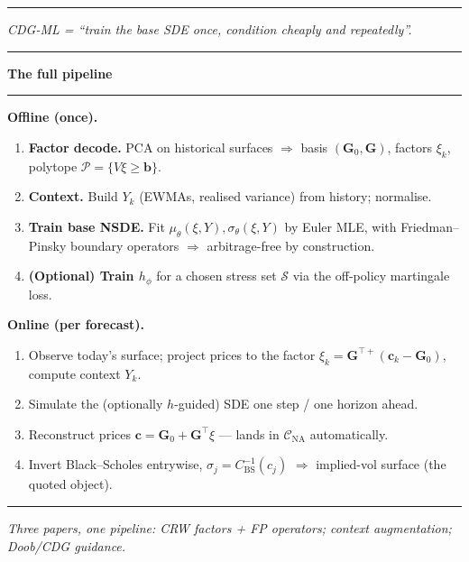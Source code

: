 \documentclass[12pt]{article}
\newcommand{\slide}[1]{%
  \par\noindent\rule{\linewidth}{1.2pt}\par\vspace{2pt}%
  {\LARGE\bfseries #1}\par\vspace{2pt}%
  \noindent\rule{\linewidth}{0.5pt}\par\vspace{8pt}}
\newcommand{\footer}[1]{\vfill\noindent\rule{\linewidth}{0.3pt}\par
  {\small\itshape #1}}
\newcommand{\cP}{\mathcal{P}}
\newcommand{\cS}{\mathcal{S}}
\newcommand{\cC}{\mathcal{C}}
\begin{document}
\footer{CDG-ML = ``train the base SDE once, condition cheaply and repeatedly''.}
\clearpage

\slide{The full pipeline}

\textbf{Offline (once).}
\begin{enumerate}
\item \textbf{Factor decode.} PCA on historical surfaces $\Rightarrow$
  basis $(\mathbf G_0,\mathbf G)$, factors $\xi_k$, polytope
  $\cP=\{V\xi\ge \mathbf b\}$.
\item \textbf{Context.} Build $Y_k$ (EWMAs, realised variance) from history;
  normalise.
\item \textbf{Train base NSDE.} Fit $\mu_\theta(\xi,Y),\sigma_\theta(\xi,Y)$
  by Euler MLE, with Friedman--Pinsky boundary operators $\Rightarrow$
  arbitrage-free by construction.
\item \textbf{(Optional) Train $h_\phi$} for a chosen stress set $\cS$ via
  the off-policy martingale loss.
\end{enumerate}

\textbf{Online (per forecast).}
\begin{enumerate}
\item Observe today's surface; project prices to the factor
  $\xi_k=\mathbf G^{\top+}(\mathbf c_k-\mathbf G_0)$, compute context $Y_k$.
\item Simulate the (optionally $h$-guided) SDE one step / one horizon ahead.
\item Reconstruct prices $\mathbf c=\mathbf G_0+\mathbf G^\top\xi$ --- lands
  in $\cC_{\mathrm{NA}}$ automatically.
\item Invert Black--Scholes entrywise, $\sigma_j=C_{\mathrm{BS}}^{-1}(c_j)$
  $\Rightarrow$ implied-vol surface (the quoted object).
\end{enumerate}

\vspace{6pt}
\begin{center}
\end{center}

\footer{Three papers, one pipeline: CRW factors + FP operators; context augmentation; Doob/CDG guidance.}
\clearpage
\end{document}
